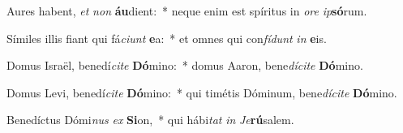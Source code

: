 \item Aures habent, \textit{et} \textit{non} \textbf{áu}dient:~* neque enim est spíritus in \textit{o}\textit{re} \textit{ip}\textbf{só}rum.
\item Símiles illis fiant qui fá\textit{ci}\textit{unt} \textbf{e}a:~* et omnes qui con\textit{fí}\textit{dunt} \textit{in} \textbf{e}is.
\item Domus Israël, benedí\textit{ci}\textit{te} \textbf{Dó}mino:~* domus Aaron, bene\textit{dí}\textit{ci}\textit{te} \textbf{Dó}mino.
\item Domus Levi, benedí\textit{ci}\textit{te} \textbf{Dó}mino:~* qui timétis Dóminum, bene\textit{dí}\textit{ci}\textit{te} \textbf{Dó}mino.
\item Benedíctus Dómi\textit{nus} \textit{ex} \textbf{Si}on,~* qui hábi\textit{tat} \textit{in} \textit{Je}\textbf{rú}salem.

